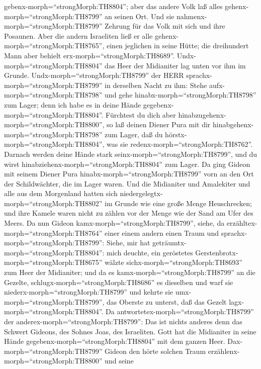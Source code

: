 gebenx-morph=``strongMorph:TH8804''; aber das andere Volk laß alles
gehenx-morph=``strongMorph:TH8799'' an seinen Ort.  Und sie
nahmenx-morph=``strongMorph:TH8799'' Zehrung für das Volk mit sich und
ihre Posaunen. Aber die andern Israeliten ließ er alle
gehenx-morph=``strongMorph:TH8765'', einen jeglichen in seine Hütte; die
dreihundert Mann aber behielt erx-morph=``strongMorph:TH8689''.
Undx-morph=``strongMorph:TH8804'' das Heer der Midianiter lag unten vor
ihm im Grunde.  Undx-morph=``strongMorph:TH8799'' der HERR
sprachx-morph=``strongMorph:TH8799'' in derselben Nacht zu ihm: Stehe
aufx-morph=``strongMorph:TH8798'' und gehe
hinabx-morph=``strongMorph:TH8798'' zum Lager; denn ich habe es in deine
Hände gegebenx-morph=``strongMorph:TH8804''.  Fürchtest du
dich aber hinabzugehenx-morph=``strongMorph:TH8800'', so laß deinen
Diener Pura mit dir hinabgehenx-morph=``strongMorph:TH8798'' zum Lager,
 daß du hörstx-morph=``strongMorph:TH8804'', was sie
redenx-morph=``strongMorph:TH8762''. Darnach werden deine Hände stark
seinx-morph=``strongMorph:TH8799'', und du wirst
hinabziehenx-morph=``strongMorph:TH8804'' zum Lager. Da ging Gideon mit
seinem Diener Pura hinabx-morph=``strongMorph:TH8799'' vorn an den Ort
der Schildwächter, die im Lager waren.  Und die Midianiter
und Amalekiter und alle aus dem Morgenland hatten sich
niedergelegtx-morph=``strongMorph:TH8802'' im Grunde wie eine große
Menge Heuschrecken; und ihre Kamele waren nicht zu zählen vor der Menge
wie der Sand am Ufer des Meers.  Da nun Gideon
kamx-morph=``strongMorph:TH8799'', siehe, da
erzähltex-morph=``strongMorph:TH8764'' einer einem andern einen Traum
und sprachx-morph=``strongMorph:TH8799'': Siehe, mir hat
geträumtx-morph=``strongMorph:TH8804'': mich deuchte, ein geröstetes
Gerstenbrotx-morph=``strongMorph:TH8675'' wälzte
sichx-morph=``strongMorph:TH8693'' zum Heer der Midianiter; und da es
kamx-morph=``strongMorph:TH8799'' an die Gezelte,
schlugx-morph=``strongMorph:TH8686'' es dieselben und warf sie
niederx-morph=``strongMorph:TH8799'' und kehrte sie
umx-morph=``strongMorph:TH8799'', das Oberste zu unterst, daß das Gezelt
lagx-morph=``strongMorph:TH8804''.  Da
antwortetex-morph=``strongMorph:TH8799'' der
anderex-morph=``strongMorph:TH8799'': Das ist nichts anderes denn das
Schwert Gideons, des Sohnes Joas, des Israeliten. Gott hat die
Midianiter in seine Hände gegebenx-morph=``strongMorph:TH8804'' mit dem
ganzen Heer.  Dax-morph=``strongMorph:TH8799'' Gideon den
hörte solchen Traum erzählenx-morph=``strongMorph:TH8800'' und seine
